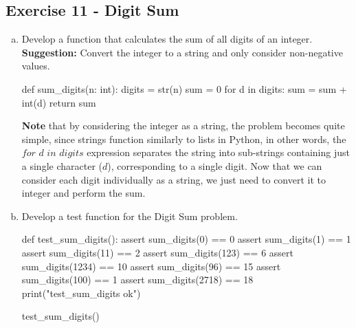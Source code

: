\documentclass[12pt]{article}
\begin{document}
\subsection*{Exercise 11 - Digit Sum}
\begin{enumerate}[a)]
  \item Develop a function that calculates the sum of all digits of an integer. 
  \textbf{Suggestion:} Convert the integer to a string and only consider 
    non-negative values.
\begin{pythonlst}
def sum_digits(n: int):
  digits = str(n)
  sum = 0
  for d in digits:
    sum = sum + int(d)
  return sum
\end{pythonlst}
\textbf{Note} that by considering the integer as a string, the problem becomes
quite simple, since strings function similarly to lists in Python, in other words,
the $\textit{for } d \textit{ in } digits$ expression separates the string into
sub-strings containing just a single character ($d$), corresponding to a single
digit. Now that we can consider each digit individually as a string, we just 
need to convert it to integer and perform the sum. 
  \item Develop a test function for the Digit Sum problem.
\begin{pythonlst}
def test_sum_digits():
  assert sum_digits(0) == 0
  assert sum_digits(1) == 1
  assert sum_digits(11) == 2
  assert sum_digits(123) == 6
  assert sum_digits(1234) == 10
  assert sum_digits(96) == 15
  assert sum_digits(100) == 1
  assert sum_digits(2718) == 18
  print("test_sum_digits ok")

test_sum_digits()
\end{pythonlst}
\end{enumerate}
\end{document}
